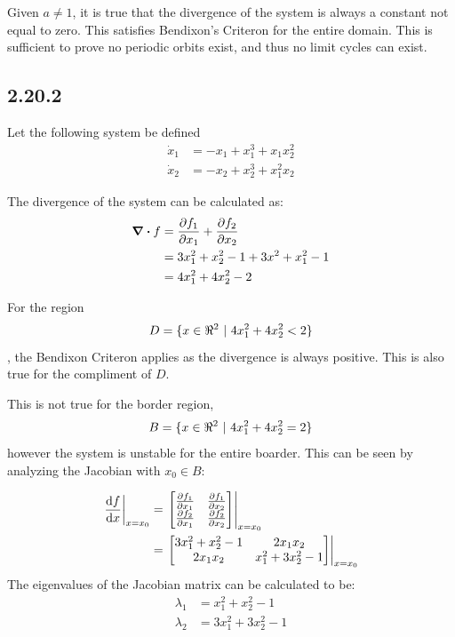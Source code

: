 \documentclass[letter]{article}
\begin{document}
Given $a \neq 1$, it is true that the divergence of the system is always a constant not equal to zero. This satisfies Bendixon's Criteron for the entire domain. This is sufficient to prove no periodic orbits exist, and thus no limit cycles can exist.

\newpage
\subsection{2.20.2}
Let the following system be defined
\begin{equation}
	\begin{aligned}
		\dot{x}_1 &= -x_1 + x_1^3 + x_1 x_2^2\\
		\dot{x}_2 &= -x_2 + x_2^3 + x_1^2 x_2
	\end{aligned}
\end{equation}

The divergence of the system can be calculated as:
\begin{align}
	\div f  &= \pdv{f_1}{x_1} + \pdv{f_2}{x_2} \nonumber\\
	&= 3x_1^2 + x_2^2 - 1 + 3 x^2 + x_1^2 - 1\\
	&= 4 x_1^2 + 4 x_2^2 - 2
\end{align}

For the region $$D = \{x\in \real^2 \ | \ 4 x_1^2 + 4 x_2^2 < 2\}$$, the Bendixon Criteron applies as the divergence is always positive. This is also true for the compliment of $D$.

This is not true for the border region,
\begin{equation}
	B = \{x \in \real^2 \ | \ 4 x_1^2 + 4 x_2^2 = 2\}
\end{equation}
however the system is unstable for the entire boarder. This can be seen by analyzing the Jacobian with $x_0 \in B$:

\begin{align}
	\eval{\dv{f}{x}}_{x=x_0} 
	&= \eval{\mqty[\pdv{f_1}{x_1} & \pdv{f_1}{x_2}\\
		\pdv{f_2}{x_1} & \pdv{f_2}{x_2}]}_{x=x_0}\\
	&= \eval{\mqty[3 x_1^2 + x_2^2 -1 & 2 x_1 x_2\\
					2 x_1 x_2 & x_1^2 + 3 x_2^2 -1]}_{x=x_0}
\end{align}
The eigenvalues of the Jacobian matrix can be calculated to be:
\begin{equation}
	\begin{aligned}
		\lambda_1 &= x_1^2 + x_2^2 -1\\
		\lambda_2 &= 3 x_1^2 + 3 x_2^2 - 1
	\end{aligned}
\end{equation}
\end{document}
